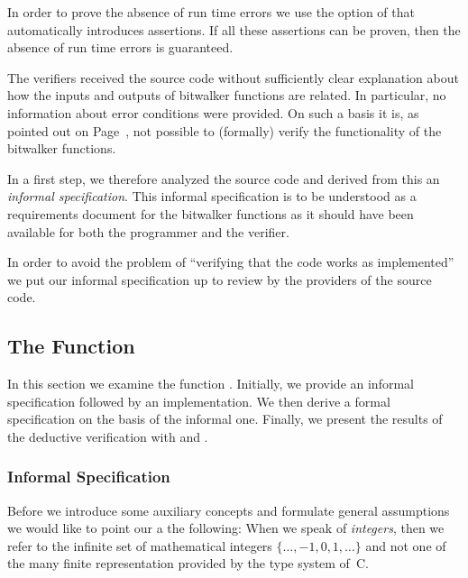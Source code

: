 In order to prove the absence of run time errors we use
the  option of \wpframac that automatically introduces \acsl
assertions. If all these assertions can be proven, then
the absence of run time errors is guaranteed.


\begin{framed}
The verifiers received the source code without sufficiently clear explanation
about how the inputs and outputs of bitwalker functions are related.
In particular, no information about error conditions were provided.
On such a basis it is, as pointed out on Page~\pageref{lesson}, not possible
to (formally) verify the functionality of the bitwalker functions.

In a first step, we therefore analyzed the source code and 
derived from this an \emph{informal specification}.
This informal specification is to be understood
as a requirements document for the bitwalker functions as it should have been
available for both the programmer and the verifier.

In order to avoid the problem of ``verifying that the code works as implemented''
we put our informal specification up to review by the providers of the source code.
\end{framed}

\clearpage

\subsection{The Function \peek}
\label{peek}


In this section we examine the function \peek.
Initially, we provide an informal specification followed by an implementation.
We then derive a formal specification on the basis of the informal one. 
Finally, we present the results of the deductive verification with \framac and \wpframac.


\subsubsection{Informal Specification}
\label{informal-peek}


Before we introduce some auxiliary concepts and formulate general assumptions
we would like to point our a the following: 
When we speak of \emph{integers}, then we refer to the infinite set of mathematical
integers $\{\ldots, -1, 0, 1, \ldots\}$
and not one of the many finite representation provided by the type system of~C.

